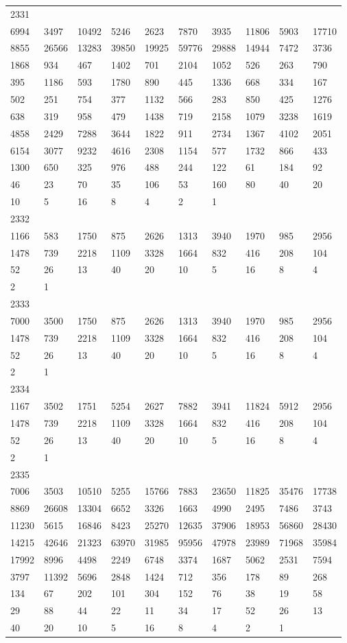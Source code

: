 \begin{longtable}{*{10}{l}}
2331&&&&&&&&&\\
6994& 3497& 10492& 5246& 2623& 7870& 3935& 11806& 5903& 17710\\
8855& 26566& 13283& 39850& 19925& 59776& 29888& 14944& 7472& 3736\\
1868& 934& 467& 1402& 701& 2104& 1052& 526& 263& 790\\
395& 1186& 593& 1780& 890& 445& 1336& 668& 334& 167\\
502& 251& 754& 377& 1132& 566& 283& 850& 425& 1276\\
638& 319& 958& 479& 1438& 719& 2158& 1079& 3238& 1619\\
4858& 2429& 7288& 3644& 1822& 911& 2734& 1367& 4102& 2051\\
6154& 3077& 9232& 4616& 2308& 1154& 577& 1732& 866& 433\\
1300& 650& 325& 976& 488& 244& 122& 61& 184& 92\\
46& 23& 70& 35& 106& 53& 160& 80& 40& 20\\
10& 5& 16& 8& 4& 2& 1& \\

2332&&&&&&&&&\\
1166& 583& 1750& 875& 2626& 1313& 3940& 1970& 985& 2956\\
1478& 739& 2218& 1109& 3328& 1664& 832& 416& 208& 104\\
52& 26& 13& 40& 20& 10& 5& 16& 8& 4\\
2& 1& \\

2333&&&&&&&&&\\
7000& 3500& 1750& 875& 2626& 1313& 3940& 1970& 985& 2956\\
1478& 739& 2218& 1109& 3328& 1664& 832& 416& 208& 104\\
52& 26& 13& 40& 20& 10& 5& 16& 8& 4\\
2& 1& \\

2334&&&&&&&&&\\
1167& 3502& 1751& 5254& 2627& 7882& 3941& 11824& 5912& 2956\\
1478& 739& 2218& 1109& 3328& 1664& 832& 416& 208& 104\\
52& 26& 13& 40& 20& 10& 5& 16& 8& 4\\
2& 1& \\

2335&&&&&&&&&\\
7006& 3503& 10510& 5255& 15766& 7883& 23650& 11825& 35476& 17738\\
8869& 26608& 13304& 6652& 3326& 1663& 4990& 2495& 7486& 3743\\
11230& 5615& 16846& 8423& 25270& 12635& 37906& 18953& 56860& 28430\\
14215& 42646& 21323& 63970& 31985& 95956& 47978& 23989& 71968& 35984\\
17992& 8996& 4498& 2249& 6748& 3374& 1687& 5062& 2531& 7594\\
3797& 11392& 5696& 2848& 1424& 712& 356& 178& 89& 268\\
134& 67& 202& 101& 304& 152& 76& 38& 19& 58\\
29& 88& 44& 22& 11& 34& 17& 52& 26& 13\\
40& 20& 10& 5& 16& 8& 4& 2& 1& \\


\end{longtable}
